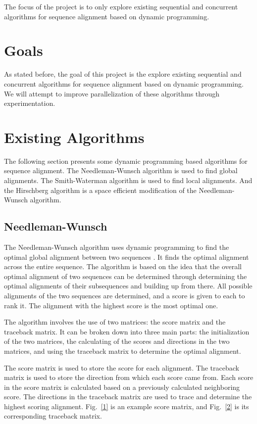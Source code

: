 \documentclass[conference]{IEEEtran}
\begin{document}
The focus of the project is to only explore existing sequential and concurrent algorithms for sequence alignment based on dynamic programming.

\section{Goals}
As stated before, the goal of this project is the explore existing sequential and concurrent algorithms for sequence alignment based on dynamic programming. We will attempt to improve parallelization of these algorithms through experimentation.

\section{Existing Algorithms}
The following section presents some dynamic programming based algorithms for sequence alignment. The Needleman-Wunsch algorithm is used to find global alignments. The Smith-Waterman algorithm is used to find local alignments. And the Hirschberg algorithm is a space efficient modification of the Needleman-Wunsch algorithm.

\subsection{Needleman-Wunsch}
The Needleman-Wunsch algorithm uses dynamic programming to find the optimal global alignment between two sequences \cite{vladimir}. It finds the optimal alignment across the entire sequence. The algorithm is based on the idea that the overall optimal alignment of two sequences can be determined through determining the optimal alignments of their subsequences and building up from there. All possible alignments of the two sequences are determined, and a score is given to each to rank it. The alignment with the highest score is the most optimal one.

The algorithm involves the use of two matrices: the score matrix and the traceback matrix. It can be broken down into three main parts: the initialization of the two matrices, the calculating of the scores and directions in the two matrices, and using the traceback matrix to determine the optimal alignment.

The score matrix is used to store the score for each alignment. The traceback matrix is used to store the direction from which each score came from. Each score in the score matrix is calculated based on a previously calculated neighboring score. The directions in the traceback matrix are used to trace and determine the highest scoring alignment. Fig.~\ref{1} is an example score matrix, and Fig.~\ref{2} is its corresponding traceback matrix.
\end{document}
